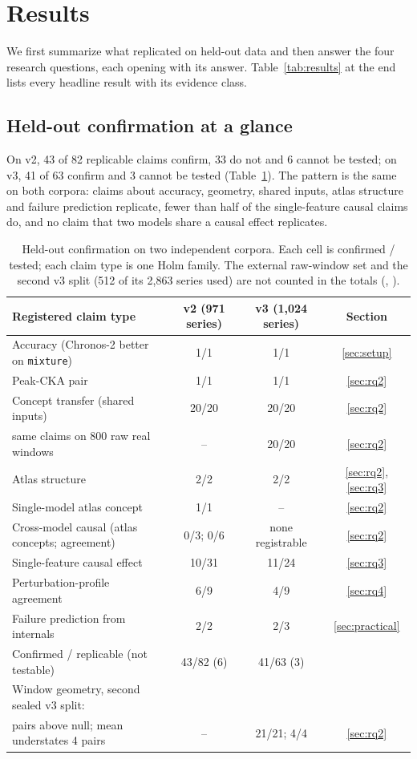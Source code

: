 \section{Results}
\label{sec:casestudy}

We first summarize what replicated on held-out data and then answer the four research questions, each opening with its
answer. Table~\ref{tab:results} at the end lists every headline result with its evidence class.

\subsection{Held-out confirmation at a glance}
\label{sec:heldout}
\label{sec:v3}

On v2, 43 of 82 replicable claims confirm, 33 do not and 6 cannot be tested; on v3, 41 of 63 confirm and 3 cannot be
tested (Table~\ref{tab:v3}). The pattern is the same on both corpora: claims about accuracy, geometry, shared inputs,
atlas structure and failure prediction replicate, fewer than half of the single-feature causal claims do, and no claim
that two models share a causal effect replicates.

\begin{table}[!tb]
\centering
\footnotesize
\begin{tabular}{@{}lccc@{}}
\toprule
Registered claim type & v2 (971 series) & v3 (1{,}024 series) & Section \\
\midrule
Accuracy (Chronos-2 better on \texttt{mixture}) & 1/1 & 1/1 & \ref{sec:setup} \\
Peak-CKA pair & 1/1 & 1/1 & \ref{sec:rq2} \\
Concept transfer (shared inputs) & 20/20 & 20/20 & \ref{sec:rq2} \\
\quad same claims on 800 raw real windows & -- & 20/20 & \ref{sec:rq2} \\
Atlas structure & 2/2 & 2/2 & \ref{sec:rq2}, \ref{sec:rq3} \\
Single-model atlas concept & 1/1 & -- & \ref{sec:rq2} \\
Cross-model causal (atlas concepts; agreement) & 0/3; 0/6 & none registrable & \ref{sec:rq2} \\
Single-feature causal effect & 10/31 & 11/24 & \ref{sec:rq3} \\
Perturbation-profile agreement & 6/9 & 4/9 & \ref{sec:rq4} \\
Failure prediction from internals & 2/2 & 2/3 & \ref{sec:practical} \\
\midrule
Confirmed / replicable (not testable) & 43/82 (6) & 41/63 (3) & \\
\midrule
Window geometry, second sealed v3 split: & & & \\
\quad 21 pairs above null; mean understates 4 pairs & -- & 21/21; 4/4 & \ref{sec:rq2} \\
\bottomrule
\end{tabular}
\caption{Held-out confirmation on two independent corpora. Each cell is confirmed / tested; each claim type is one Holm
family. The external raw-window set and the second v3 split (512 of its 2{,}863 series used) are not counted in the
totals (, ).}
\label{tab:v3}
\end{table}

